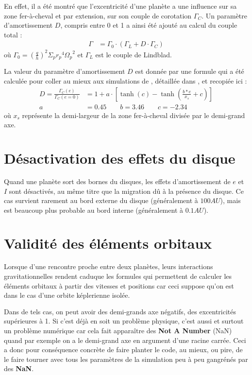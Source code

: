 En effet, il a été montré que l'excentricité d'une planète a une influence sur sa zone fer-à-cheval et par extension, sur son couple de corotation $\Gamma_C$. Un paramètre d'amortissement $D$, compris entre 0 et 1 a ainsi été ajouté au calcul du couple total :
\begin{align}
\Gamma &= \Gamma_0 \cdot (\Gamma_L + D\cdot \Gamma_C)
\end{align}
où $\Gamma_0 = \left(\frac{q}{h}\right)^2\Sigma_p {r_p}^4 {\Omega_p}^2$ et $\Gamma_L$ est le couple de Lindblad.

La valeur du paramètre d'amortissement $D$ est donnée par une formule qui a été calculée pour coller au mieux aux simulations de \cite{bitsch2010orbital}, détaillée dans \cite{cossou2013convergence}, et recopiée ici : 
\begin{subequations}
\begin{align}
D = \frac{\Gamma_C(e)}{\Gamma_C (e=0)} &= 1 + a \cdot \left[\tanh(c) - \tanh\left(\frac{b * e}{x_s}+c\right)\right]\label{eq:eccentricity-influence}\\
a &= 0.45 \qquad b=3.46 \qquad c= -2.34
\end{align}
\end{subequations}
où $x_s$ représente la demi-largeur de la zone fer-à-cheval divisée par le demi-grand axe.

\section{Désactivation des effets du disque}
Quand une planète sort des bornes du disques, les effets d'amortissement de $e$ et $I$ sont désactivés, au même titre que la migration dû à la présence du disque. Ce cas survient rarement au bord externe du disque (généralement à $100\unit{AU}$), mais est beaucoup plus probable au bord interne (généralement à $0.1\unit{AU}$).

\section{Validité des éléments orbitaux}
Lorsque d'une rencontre proche entre deux planètes, leurs interactions gravitationnelles rendent caduque les formules qui permettent de calculer les éléments orbitaux à partir des vitesses et positions car ceci suppose qu'on est dans le cas d'une orbite képlerienne isolée. 

Dans de tels cas, on peut avoir des demi-grands axe négatifs, des excentricités supérieures à 1. Si c'est déjà en soit un problème physique, c'est aussi et surtout un problème numérique car cela fait apparaître des \textbf{Not A Number} (NaN) quand par exemple on a le demi-grand axe en argument d'une racine carrée. Ceci a donc pour conséquence concrète de faire planter le code, au mieux, ou pire, de le faire tourner avec tous les paramètres de la simulation peu à peu gangrénés par des \textbf{NaN}. 

